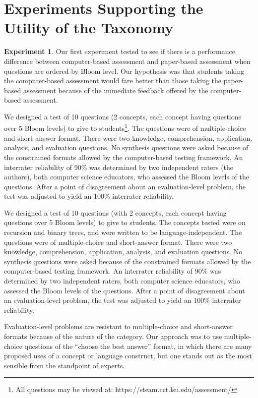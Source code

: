 \section{Experiments Supporting the Utility of the Taxonomy}

\textbf{Experiment 1}. Our first experiment tested to see if there is a
performance difference between computer-based assessment and paper-based
assessment when questions are ordered by Bloom level.  Our hypothesis was that
students taking the computer-based assessment would fare better than those
taking the paper-based assessment because of the immediate feedback offered by
the computer-based assessment.

We designed a test of 10 questions (2 concepts, each concept having questions
over 5 Bloom levels) to give to students\footnote{All questions may be viewed
at: https://steam.cct.lsu.edu/assessment/}. The questions were of
multiple-choice and short-answer format.  There were two knowledge,
comprehension, application, analysis, and evaluation questions.  No synthesis
questions were asked because of the constrained formats allowed by the
computer-based testing framework.  An interrater reliability of 90\% was
determined by two independent raters (the authors), both computer science
educators, who assessed the Bloom levels of the questions.  After a point of
disagreement about an evaluation-level problem, the test was adjusted to yield
an 100\% interrater reliability.

We designed a test of 10 questions (with 2 concepts, each concept having
questions over 5 Bloom levels) to give to students. The concepts tested were on
recursion and binary trees, and were written to be language-independent.  The
questions were of multiple-choice and short-answer format.  There were two
knowledge, comprehension, application, analysis, and evaluation questions.  No
synthesis questions were asked because of the constrained formats allowed by
the computer-based testing framework.  An interrater reliability of 90\% was
determined by two independent raters, both computer science educators, who
assessed the Bloom levels of the questions.  After a point of disagreement
about an evaluation-level problem, the test was adjusted to yield an 100\%
interrater reliability.

Evaluation-level problems are resistant to multiple-choice and short-answer
formats because of the nature of the category.  Our approach was to use
multiple-choice questions of the ``choose the best answer'' format, in which
there are many proposed uses of a concept or language construct, but one stands
out as the most sensible from the standpoint of experts. 

